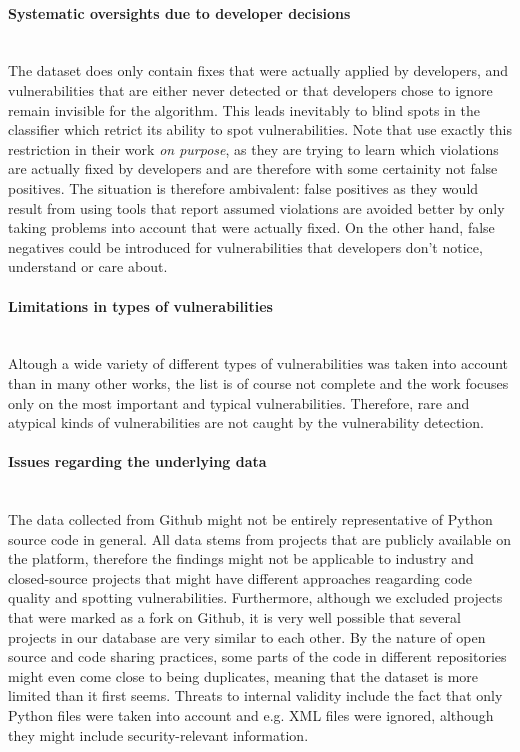 \documentclass[
	a4paper,
	pagesize,
	pdftex,
	12pt,
	twoside, %
	BCOR=5mm, %
	ngerman,
	fleqn,
	final,
	]{scrartcl}
\begin{document}
\paragraph{Systematic oversights due to developer decisions}\mbox{}\\
The dataset does only contain fixes that were actually applied by developers, and vulnerabilities that are either never detected or that developers chose to ignore remain invisible for the algorithm. This leads inevitably to blind spots in the classifier which retrict its ability to spot vulnerabilities. Note that \cite{Liu.2018} use exactly this restriction in their work \textit{on purpose}, as they are trying to learn which violations are actually fixed by developers and are therefore with some certainity not false positives. The situation is therefore ambivalent: false positives as they would result from using tools that report assumed violations are avoided better by only taking problems into account that were actually fixed. On the other hand, false negatives could be introduced for vulnerabilities that developers don't notice, understand or care about.
\paragraph{Limitations in types of vulnerabilities}\mbox{}\\
Altough a wide variety of different types of vulnerabilities was taken into account than in many other works, the list is of course not complete and the work focuses only on the most important and typical vulnerabilities. Therefore, rare and atypical kinds of vulnerabilities are not caught by the vulnerability detection.
\paragraph{Issues regarding the underlying data}\mbox{}\\
The data collected from Github might not be entirely representative of Python source code in general. All data stems from projects that are publicly available on the platform, therefore the findings might not be applicable to industry and closed-source projects that might have different approaches reagarding code quality and spotting vulnerabilities. Furthermore, although we excluded projects that were marked as a fork on Github, it is very well possible that several projects in our database are very similar to each other. By the nature of open source and code sharing practices, some parts of the code in different repositories might even come close to being duplicates, meaning that the dataset is more limited than it first seems. Threats to internal validity include the fact that only Python files were taken into account and e.g. XML files were ignored, although they might include security-relevant information. 
\end{document}
